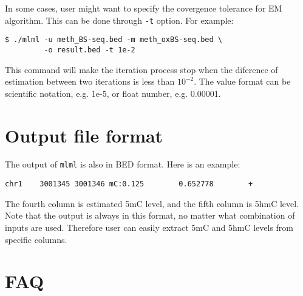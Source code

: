 \documentclass[11pt]{article}
\newcommand{\prog}[1]{\texttt{#1}}
\newcommand{\op}[1]{\texttt{#1}}
\begin{document}
In some cases, user might want to specify the covergence tolerance for EM algorithm. This can be done through \op{-t} option. For example:
\begin{verbatim}
$ ./mlml -u meth_BS-seq.bed -m meth_oxBS-seq.bed \
         -o result.bed -t 1e-2
\end{verbatim}
This command will make the iteration process stop when the diference of estimation between two iterations is less than $10^{-2}$. The value format can be scientific notation, e.g. 1e-5, or float number, e.g. 0.00001.

\section{Output file format}
The output of \prog{mlml} is also in BED format. Here is an example:
\begin{verbatim}
chr1    3001345 3001346 mC:0.125        0.652778        +
\end{verbatim}
The fourth column is estimated 5mC level, and the fifth column is 5hmC level. Note that the output is always in this format, no matter what combination of inputs are used. Therefore user can easily extract 5mC and 5hmC levels from specific columns.

\section{FAQ}
\end{document}
